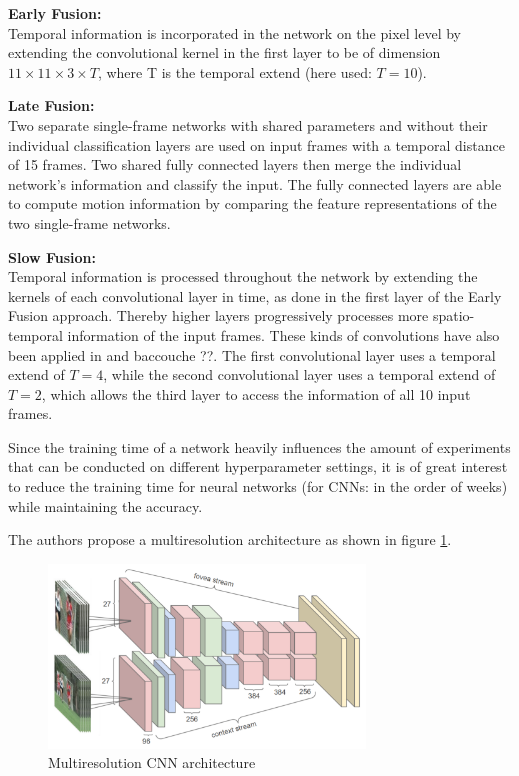 \textbf{Early Fusion:} \\
Temporal information is incorporated in the network on the pixel level by extending the convolutional kernel in the first layer to be of dimension $11 \times 11 \times 3 \times T$, where T is the temporal extend (here used: $T = 10$).

\textbf{Late Fusion:} \\
Two separate single-frame networks with shared parameters and without their individual classification layers are used on input frames with a temporal distance of 15 frames.
Two shared fully connected layers then merge the individual network's information and classify the input. 
The fully connected layers are able to compute motion information by comparing the feature representations of the two single-frame networks.

\textbf{Slow Fusion:} \\
Temporal information is processed throughout the network by extending the kernels of each convolutional layer in time, as done in the first layer of the Early Fusion approach.
Thereby higher layers progressively processes more spatio-temporal information of the input frames.
These kinds of convolutions have also been applied in \cite{ji_3d_2013} and baccouche ??.
The first convolutional layer uses a temporal extend of $T = 4$, while the second convolutional layer uses a temporal extend of $T = 2$, which allows the third layer to access the information of all 10 input frames.

Since the training time of a network heavily influences the amount of experiments that can be conducted on different hyperparameter settings, it is of great interest to reduce the training time for neural networks (for CNNs: in the order of weeks) while maintaining the accuracy.

The authors propose a multiresolution architecture as shown in figure \ref{fig:largescale_multiresolution}.

\begin{figure}[H]
    \centering
    \includegraphics[width=0.75\textwidth]{img_deep/largescale_multiresolution.png}
    \caption{Multiresolution CNN architecture \cite{karpathy_large-scale_2014}}
    \label{fig:largescale_multiresolution}
\end{figure}

